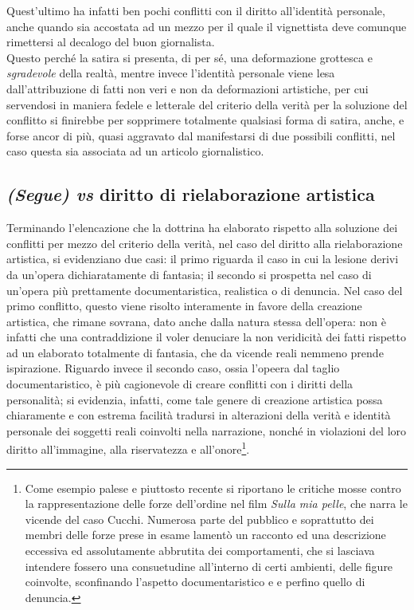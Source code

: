 Quest'ultimo ha infatti ben pochi conflitti con il diritto all’identità personale, anche quando sia accostata ad un mezzo per il quale il vignettista deve comunque rimettersi al decalogo del buon giornalista.
\\Questo perché la satira si presenta, di per sé, una deformazione grottesca e \textit{sgradevole} della realtà, mentre invece l’identità personale viene lesa dall’attribuzione di fatti non veri e non da deformazioni artistiche, per cui servendosi in maniera fedele e letterale del criterio della verità per la soluzione del conflitto si finirebbe per sopprimere totalmente qualsiasi forma di satira, anche, e forse ancor di più, quasi aggravato dal manifestarsi di due possibili conflitti, nel caso questa sia associata ad un articolo giornalistico.
\subsection{\textit{(Segue) vs} diritto di rielaborazione artistica}
Terminando l'elencazione che la dottrina ha elaborato rispetto alla soluzione dei conflitti per mezzo del criterio della verità, nel caso del diritto alla rielaborazione artistica, si evidenziano due casi:
il primo riguarda il caso in cui la lesione derivi da un'opera dichiaratamente di fantasia; il secondo si prospetta nel caso di un'opera più prettamente documentaristica, realistica o di denuncia.
Nel caso del primo conflitto, questo viene risolto interamente in favore della creazione artistica, che rimane sovrana, dato anche dalla natura stessa dell'opera: non è infatti che una contraddizione il voler denuciare la non veridicità dei fatti rispetto ad un elaborato totalmente di fantasia, che da vicende reali nemmeno prende ispirazione.
Riguardo invece il secondo caso, ossia l'opeera dal taglio documentaristico, è più cagionevole di creare conflitti con i diritti della personalità; si evidenzia, infatti, come
tale genere di creazione artistica possa chiaramente e con estrema facilità tradursi in alterazioni della verità e identità personale dei soggetti reali coinvolti nella narrazione, nonché in violazioni del loro diritto all’immagine, alla riservatezza e all’onore\footnote{Come esempio palese e piuttosto recente si riportano le critiche mosse contro la rappresentazione delle forze dell'ordine nel film \textit{Sulla mia pelle}, che narra le vicende del caso Cucchi. Numerosa parte del pubblico e soprattutto dei membri delle forze prese in esame lamentò un racconto ed una descrizione eccessiva ed assolutamente abbrutita dei comportamenti, che si lasciava intendere fossero una consuetudine all'interno di certi ambienti, delle figure coinvolte, sconfinando l'aspetto documentaristico e e perfino quello di denuncia. }.
